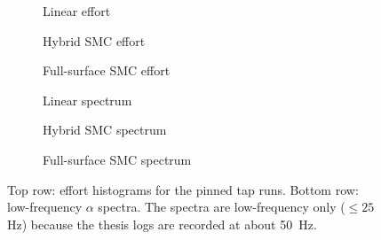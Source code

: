 \begin{figure}[htbp]
  \centering
  \begin{subfigure}[t]{0.32\linewidth}
    \centering
    \caption{Linear effort}
  \end{subfigure}\hfill
  \begin{subfigure}[t]{0.32\linewidth}
    \centering
    \caption{Hybrid SMC effort}
  \end{subfigure}\hfill
  \begin{subfigure}[t]{0.32\linewidth}
    \centering
    \caption{Full-surface SMC effort}
  \end{subfigure}

  \medskip

  \begin{subfigure}[t]{0.32\linewidth}
    \centering
    \caption{Linear spectrum}
  \end{subfigure}\hfill
  \begin{subfigure}[t]{0.32\linewidth}
    \centering
    \caption{Hybrid SMC spectrum}
  \end{subfigure}\hfill
  \begin{subfigure}[t]{0.32\linewidth}
    \centering
    \caption{Full-surface SMC spectrum}
  \end{subfigure}
  \caption{Top row: effort histograms for the pinned tap runs. Bottom row: low-frequency $\alpha$ spectra. The spectra are low-frequency only ($\leq 25$ Hz) because the thesis logs are recorded at about \SI{50}{Hz}.}
  \label{fig:tap_effort_spectrum_support}
\end{figure}

